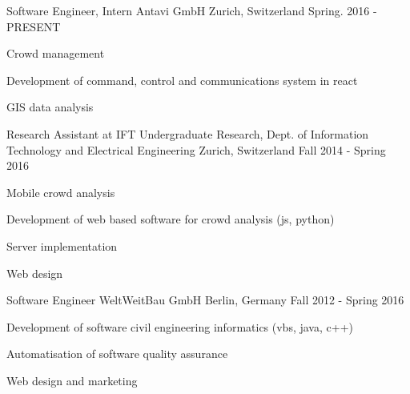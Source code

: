 

\begin{cventries}

  \cventry
    {Software Engineer, Intern} %
    {Antavi GmbH} %
    {Zurich, Switzerland} %
    {Spring. 2016 - PRESENT} %
    {
      \begin{cvitems} %
        \item {Crowd management}
        \item {Development of command, control and communications system in react }
        \item {GIS data analysis}
      \end{cvitems}
    }

  \cventry
    {Research Assistant at IFT} %
    {Undergraduate Research, Dept. of Information Technology and Electrical Engineering} %
    {Zurich, Switzerland} %
    {Fall 2014 - Spring 2016} %
    {
      \begin{cvitems} %
        \item {Mobile crowd analysis }
        \item {Development of web based software for crowd analysis (js, python)}
        \item {Server implementation}
        \item {Web design}
      \end{cvitems}
    }

  \cventry
    {Software Engineer} %
    {WeltWeitBau GmbH} %
    {Berlin, Germany} %
    {Fall 2012 - Spring 2016} %
    {
      \begin{cvitems} %
        \item {Development of software civil engineering informatics (vbs, java, c++)}
        \item {Automatisation of software quality assurance}
        \item {Web design and marketing}
      \end{cvitems}
    }


\end{cventries}
